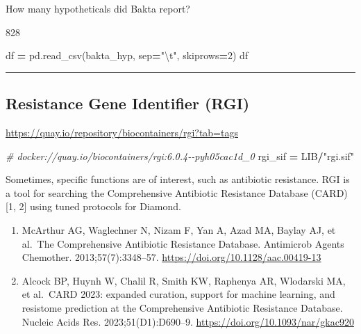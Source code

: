\documentclass[
]{book}
\newenvironment{Shaded}{\begin{snugshade}}{\end{snugshade}}
\newcommand{\CharTok}[1]{\textcolor[rgb]{0.31,0.60,0.02}{#1}}
\newcommand{\CommentTok}[1]{\textcolor[rgb]{0.56,0.35,0.01}{\textit{#1}}}
\newcommand{\DecValTok}[1]{\textcolor[rgb]{0.00,0.00,0.81}{#1}}
\newcommand{\NormalTok}[1]{#1}
\newcommand{\OperatorTok}[1]{\textcolor[rgb]{0.81,0.36,0.00}{\textbf{#1}}}
\newcommand{\StringTok}[1]{\textcolor[rgb]{0.31,0.60,0.02}{#1}}
\providecommand{\tightlist}{%
  \setlength{\itemsep}{0pt}\setlength{\parskip}{0pt}}
\begin{document}
How many hypotheticals did Bakta report?

828

\begin{Shaded}
\begin{Highlighting}[numbers=left,,]
\NormalTok{df }\OperatorTok{=}\NormalTok{ pd.read\_csv(bakta\_hyp, sep}\OperatorTok{=}\StringTok{"}\CharTok{\textbackslash{}t}\StringTok{"}\NormalTok{, skiprows}\OperatorTok{=}\DecValTok{2}\NormalTok{)}
\NormalTok{df}
\end{Highlighting}
\end{Shaded}

\begin{center}\rule{0.5\linewidth}{0.5pt}\end{center}

\subsection{Resistance Gene Identifier (RGI)}\label{resistance-gene-identifier-rgi}

\url{https://quay.io/repository/biocontainers/rgi?tab=tags}

\begin{Shaded}
\begin{Highlighting}[numbers=left,,]
\CommentTok{\# docker://quay.io/biocontainers/rgi:6.0.4{-}{-}pyh05cac1d\_0}
\NormalTok{rgi\_sif }\OperatorTok{=}\NormalTok{ LIB}\OperatorTok{/}\StringTok{"rgi.sif"}
\end{Highlighting}
\end{Shaded}

Sometimes, specific functions are of interest, such as antibiotic resistance.
RGI is a tool for searching the Comprehensive Antibiotic Resistance Database (CARD) {[}1, 2{]} using tuned protocols for Diamond.

\begin{enumerate}
\def\labelenumi{\arabic{enumi}.}
\tightlist
\item
  McArthur AG, Waglechner N, Nizam F, Yan A, Azad MA, Baylay AJ, et al.~The Comprehensive Antibiotic Resistance Database. Antimicrob Agents Chemother. 2013;57(7):3348--57. \url{https://doi.org/10.1128/aac.00419-13}
\item
  Alcock BP, Huynh W, Chalil R, Smith KW, Raphenya AR, Wlodarski MA, et al.~CARD 2023: expanded curation, support for machine learning, and resistome prediction at the Comprehensive Antibiotic Resistance Database. Nucleic Acids Res. 2023;51(D1):D690--9. \url{https://doi.org/10.1093/nar/gkac920}
\end{enumerate}
\end{document}

